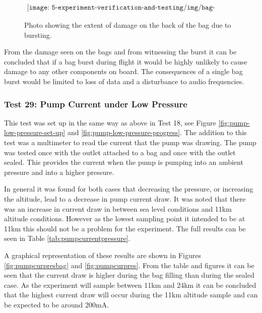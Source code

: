 \begin{figure}[H]
    \begin{align*}
        \texttt{[image: 5-experiment-verification-and-testing/img/bag-burst-back.png]}
    \end{align*}
    \caption {Photo showing the extent of damage on the back of the bag due to bursting.} \label{fig:bag-burst-back}
\end{figure}

From the damage seen on the bags and from witnessing the burst it can be concluded that if a bag burst during flight it would be highly unlikely to cause damage to any other components on board. The consequences of a single bag burst would be limited to loss of data and a disturbance to audio frequencies. 

\subsubsection{Test 29: Pump Current under Low Pressure}

This test was set up in the same way as above in Test 18, see Figure \ref{fig:pump-low-pressure-set-up} and \ref{fig:pump-low-pressure-progress}. The addition to this test was a multimeter to read the current that the pump was drawing. The pump was tested once with the outlet attached to a bag and once with the outlet sealed. This provides the current when the pump is pumping into an ambient pressure and into a higher pressure.

In general it was found for both cases that decreasing the pressure, or increasing the altitude, lead to a decrease in pump current draw. It was noted that there was an increase in current draw in between sea level conditions and 11km altitude conditions. However as the lowest sampling point it intended to be at 11km this should not be a problem for the experiment. The full results can be seen in Table \ref{tab:pumpcurrentpressure}. 



A graphical representation of these results are shown in Figures \ref{fig:pumpcurpresbag} and \ref{fig:pumpcurpres}. From the table and figures it can be seen that the current draw is higher during the bag filling than during the sealed case. As the experiment will sample between 11km and 24km it can be concluded that the highest current draw will occur during the 11km altitude sample and can be expected to be around 200mA. 

